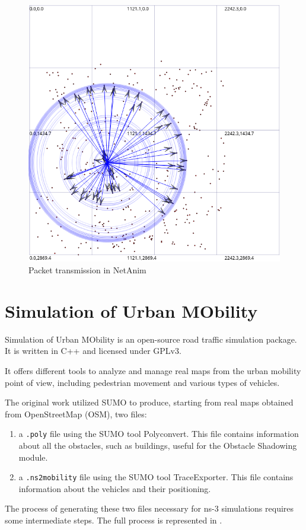 			\begin{figure}[H]
				\centering
				\includegraphics[scale=0.38]{immagini/netanim}
				\caption{Packet transmission in NetAnim}
				\label{fig:netanim}
			\end{figure}
		
	\section{Simulation of Urban MObility}
		Simulation of Urban MObility is an open-source road traffic simulation package. It is written in C++ and licensed under GPLv3. 
		
		
		It offers different tools to analyze and manage real maps from the urban mobility point of view, including pedestrian movement and various types of vehicles.
		

		The original work \cite{ROM2017} utilized SUMO to produce, starting from real maps obtained from OpenStreetMap (OSM), two files:
		\begin{enumerate}
			\item a \texttt{.poly} file using the SUMO tool Polyconvert. This file contains information about all the obstacles, such as buildings, useful for the Obstacle Shadowing module.
			\item a \texttt{.ns2mobility} file using the SUMO tool TraceExporter. This file contains information about the vehicles and their positioning. 
		\end{enumerate}
		The process of generating these two files necessary for ns-3 simulations requires some intermediate steps. The full process is represented in . 
		

